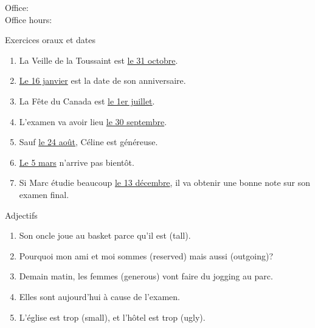 \documentclass{beamer}
\subtitle[Révision: Examen 1]{La révision pour l'examen 1}
\begin{document}
  \begin{frame}
    \titlepage
    \tiny{Office: \\
          Office hours: }
  \end{frame}

  \begin{frame}{Exercices oraux et dates}
    \begin{enumerate}
      \item<2-> La Veille de la Toussaint est \underline{le 31 octobre}.
      \item<3-> \underline{Le 16 janvier} est la date de son anniversaire.
      \item<4-> La Fête du Canada est \underline{le 1er juillet}.
      \item<5-> L'examen va avoir lieu \underline{le 30 septembre}.
      \item<6-> Sauf \underline{le 24 août}, Céline est généreuse.
      \item<7-> \underline{Le 5 mars} n'arrive pas bientôt.
      \item<8-> Si Marc étudie beaucoup \underline{le 13 décembre}, il va obtenir une bonne note sur son examen final.
    \end{enumerate}
  \end{frame}

  \begin{frame}{Adjectifs}
    \begin{enumerate}
      \item Son oncle joue au basket parce qu'il est \underline{} (tall).
      \item Pourquoi mon ami et moi sommes \underline{} (reserved) mais aussi \underline{} (outgoing)?
      \item Demain matin, les femmes \underline{} (generous) vont faire du jogging au parc.
      \item Elles sont \underline{} aujourd'hui à cause de l'examen.
      \item L'église est trop \underline{} (small), et l'hôtel est trop \underline{} (ugly).
    \end{enumerate}
  \end{frame}
\end{document}
